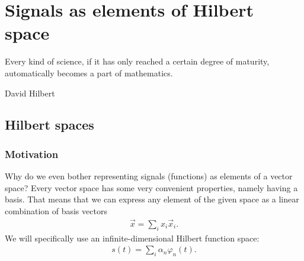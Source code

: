 \documentclass[11pt,a4paper]{report}
\theoremstyle{remark}
\theoremstyle{definition}
\begin{document}
	\chapter{Signals as elements of Hilbert space}
	\epigraph{
		Every kind of science, if it has only reached a certain degree of maturity, automatically becomes a part of mathematics.
	}{David Hilbert}
		
		\section{Hilbert spaces}
			
			\subsection{Motivation}
				
				Why do we even bother representing signals (functions) as elements of a vector space? Every vector space has some very convenient properties, namely having a basis. That means that we can express any element of the given space as a linear combination of basis vectors
				\begin{align}
					\vec x = \sum_{i} x_i \vec x_i.
				\end{align}
				We will specifically use an infinite-dimensional Hilbert function space:
				\begin{align}
					\label{eq:lincomb}
					s(t) = \sum_{i} \alpha_n \varphi_n(t).
				\end{align}
				
\end{document}
